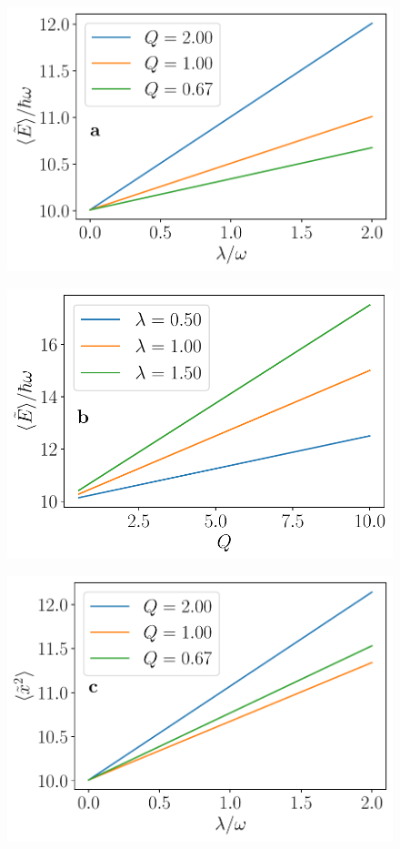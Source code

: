 \begin{subfigure}[t]{0.48\textwidth}
    \includegraphics[width=\textwidth]{figures/E_vs_lambda}
\end{subfigure}
\hfill
\begin{subfigure}[t]{0.48\textwidth}
    \includegraphics[width=\textwidth]{figures/E_vs_Q}
\end{subfigure}
\begin{subfigure}[t]{0.48\textwidth}
    \includegraphics[width=\textwidth]{figures/x2_vs_lambda}
\end{subfigure}
